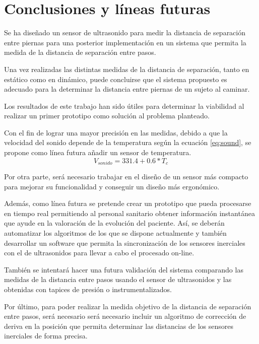 \chapter{Conclusiones y líneas futuras\label{sec:conclusiones}}

Se ha diseñado un sensor de ultrasonido para medir la distancia de separación entre piernas para una posterior implementación en un sistema que permita la medida de la distancia de separación entre pasos.

Una vez realizadas las distintas medidas de la distancia de separación, tanto en estático como en dinámico, puede concluirse que el sistema propuesto es adecuado para la determinar la distancia entre piernas de un sujeto al caminar.

Los resultados de este trabajo han sido útiles para determinar la viabilidad al realizar un primer prototipo como solución al problema planteado.

Con el fin de lograr una mayor precisión en las medidas, debido a que la velocidad del sonido depende de la temperatura según la ecuación \ref{eq:sound}, se propone como línea futura añadir un sensor de temperatura.
\begin{equation}\label{eq:sound}
V_{sonido} = 331.4 + 0.6*T_{c}
\end{equation}

Por otra parte, será necesario trabajar en el diseño de un sensor más compacto para mejorar su funcionalidad y conseguir un diseño más ergonómico.


Además, como línea futura se pretende crear un prototipo que pueda procesarse en tiempo real permitiendo al personal sanitario obtener información instantánea que ayude en la valoración de la evolución del paciente. Así, se deberán automatizar los algoritmos de los que se dispone actualmente y también desarrollar un software que permita la sincronización de los sensores inerciales con el de ultrasonidos para llevar a cabo el procesado on-line.

También se intentará hacer una futura validación del sistema comparando las medidas de la distancia entre pasos usando el sensor de ultrasonidos y las obtenidas con tapices de presión o instrumentalizados.

Por último, para poder realizar la medida objetivo de la distancia de separación entre pasos, será necesario será necesario incluir un algoritmo de corrección de deriva en la posición que permita determinar las distancias de los sensores inerciales de forma precisa. 
